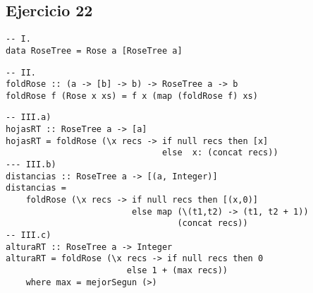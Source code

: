\documentclass[10pt,a4paper]{article}
\begin{document}
\subsection{Ejercicio 22}
\begin{centrado}
    \begin{verbatim}
-- I.
data RoseTree = Rose a [RoseTree a]   
    \end{verbatim}
\end{centrado}

\begin{centrado}
    \begin{verbatim}
-- II.
foldRose :: (a -> [b] -> b) -> RoseTree a -> b
foldRose f (Rose x xs) = f x (map (foldRose f) xs)
    \end{verbatim}
\end{centrado}

\begin{centrado}
    \begin{verbatim}
-- III.a)
hojasRT :: RoseTree a -> [a]
hojasRT = foldRose (\x recs -> if null recs then [x]
                               else  x: (concat recs))
--- III.b)
distancias :: RoseTree a -> [(a, Integer)]
distancias = 
    foldRose (\x recs -> if null recs then [(x,0)]
                         else map (\(t1,t2) -> (t1, t2 + 1)) 
                                  (concat recs))
-- III.c)
alturaRT :: RoseTree a -> Integer
alturaRT = foldRose (\x recs -> if null recs then 0
                        else 1 + (max recs))
    where max = mejorSegun (>)
    \end{verbatim}
\end{centrado}
\end{document}
